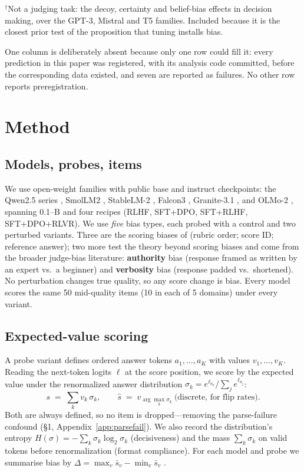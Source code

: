 \documentclass[11pt]{article}
\begin{document}
\begin{table}[t]
\vspace{2pt}
{\footnotesize $^{\dagger}$Not a judging task: the decoy, certainty and
belief-bias effects in decision making, over the GPT-3, Mistral and T5 families.
Included because it is the closest prior test of the proposition that tuning
installs bias.\par
One column is deliberately absent because only one row could fill it: every
prediction in this paper was registered, with its analysis code committed, before
the corresponding data existed, and seven are reported as failures. No other row
reports preregistration.}
\end{table}

\section{Method}
\subsection{Models, probes, items}
We use \NFAM{} open-weight families with public base and instruct checkpoints: the
Qwen2.5 series \citep{qwen25}, SmolLM2 \citep{smollm2}, StableLM-2 \citep{stablelm2},
Falcon3 \citep{falcon3}, Granite-3.1 \citep{granite3}, and OLMo-2 \citep{olmo2},
spanning 0.1--\MAXB{}B and four recipes (RLHF, SFT+DPO, SFT+RLHF, SFT+DPO+RLVR). We
use \emph{five} bias types, each probed with a control and two perturbed variants. Three
are the scoring biases of \citet{li2025scoring} (rubric order; score ID; reference
answer); two more test the theory beyond scoring biases and come from the broader
judge-bias literature: \textbf{authority} bias (response framed as written by an expert
vs.\ a beginner) and \textbf{verbosity} bias (response padded vs.\ shortened). No
perturbation changes true quality, so any score change is bias. Every model scores the
same 50 mid-quality items (10 in each of 5 domains) under every variant.

\subsection{Expected-value scoring}\label{sec:evs}
A probe variant defines ordered answer tokens $a_1,\dots,a_K$ with values
$v_1,\dots,v_K$. Reading the next-token logits $\ell$ at the score position, we score
by the expected value under the renormalized answer distribution
$\sigma_k = e^{\ell_{a_k}}/\sum_j e^{\ell_{a_j}}$:
\[
s \;=\; \textstyle\sum_k v_k\,\sigma_k, \qquad
\hat s \;=\; v_{\arg\max_k \sigma_k}\ \text{(discrete, for flip rates)} .
\]
Both are always defined, so no item is dropped---removing the parse-failure confound
(\S1, Appendix~\ref{app:parsefail}). We also record the distribution's entropy
$H(\sigma)=-\sum_k\sigma_k\log_2\sigma_k$ (decisiveness) and the mass $\sum_k\sigma_k$
on valid tokens before renormalization (format compliance). For each model and probe
we summarise bias by $\Delta=\max_v \bar s_v-\min_v \bar s_v$ \citep{li2025scoring}.
\end{document}
